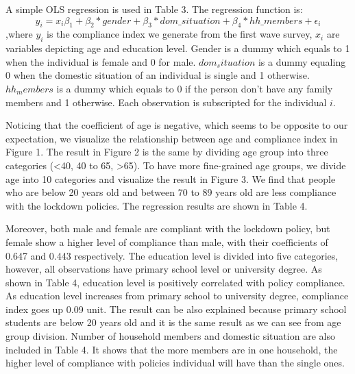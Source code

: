 \documentclass{article}
\begin{document}
A simple OLS regression is used in Table 3.
The regression function is:
$$
y_i = x_i \beta_1 + \beta_2*gender + \beta_3 *dom\_situation + \beta_4*hh\_members + \epsilon_i
$$
,where $y_i$ is the compliance index we generate from the first wave survey, $x_i$ are variables depicting age and education level. Gender is a dummy which equals to 1 when the individual is female and 0 for male. $dom_situation$ is a dummy equaling 0 when the domestic situation of an individual is single and 1 otherwise. $hh_members$ is a dummy which equals to 0 if the person don't have any family members and 1 otherwise. Each observation is subscripted for the individual $i$.

Noticing that the coefficient of age is negative, which seems to be opposite to our expectation, we visualize the relationship between age and compliance index in Figure 1. The result in Figure 2 is the same by dividing age group into three categories (\textless{40}, 40 to 65, \textgreater{65}). To have more fine-grained age groups, we divide age into 10 categories and visualize the result in Figure 3. We find that people who are below 20 years old and between 70 to 89 years old are less compliance with the lockdown policies. The regression results are shown in Table 4.


Moreover, both male and female are compliant with the lockdown policy, but female show a higher level of compliance than male, with their coefficients of 0.647 and 0.443 respectively.
The education level is divided into five categories, however, all observations have primary school level or university degree. As shown in Table 4, education level is positively correlated with policy compliance. As education level increases from primary school to university degree, compliance index goes up 0.09 unit. The result can be also explained because primary school students are below 20 years old and it is the same result as we can see from age group division.
Number of household members and domestic situation are also included in Table 4. It shows that the more members are in one household, the higher level of compliance with policies individual will have than the single ones.
\end{document}
